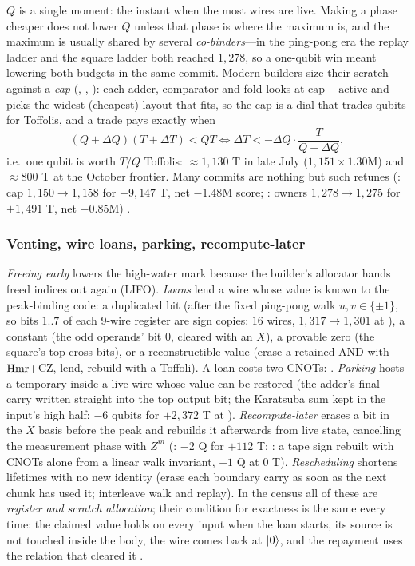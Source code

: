 $Q$ is a single moment: the instant when the most wires are live. Making a phase cheaper does not lower $Q$ unless that phase is where the maximum is, and the maximum is usually shared by several \emph{co-binders}---in the ping-pong era the replay ladder and the square ladder both reached $1{,}278$, so a one-qubit win meant lowering both budgets in the same commit. Modern builders size their scratch against a \emph{cap} (, , ): each adder, comparator and fold looks at $\mathrm{cap}-\mathrm{active}$ and picks the widest (cheapest) layout that fits, so the cap is a dial that trades qubits for Toffolis, and a trade pays exactly when
\begin{equation}\label{eq:exchange}
(Q+\Delta Q)(T+\Delta T)<QT\iff \Delta T<-\Delta Q\cdot\frac{T}{Q+\Delta Q},
\end{equation}
i.e.\ one qubit is worth $T/Q$ Toffolis: $\approx1{,}130$ T in late July ($1{,}151\times1.30$M) and $\approx800$ T at the October frontier. Many commits are nothing but such retunes (: cap $1{,}150\to1{,}158$ for $-9{,}147$ T, net $-1.48$M score; : owners $1{,}278\to1{,}275$ for $+1{,}491$ T, net $-0.85$M) \cite{ecdsafail-wiki}.

\subsubsection{Venting, wire loans, parking, recompute-later}\label{sec:venting}

\emph{Freeing early} lowers the high-water mark because the builder's allocator hands freed indices out again (LIFO). \emph{Loans} lend a wire whose value is known to the peak-binding code: a duplicated bit (after the fixed ping-pong walk $u,v\in\{\pm1\}$, so bits $1..7$ of each $9$-wire register are sign copies: $16$ wires, $1{,}317\to1{,}301$ at ), a constant (the odd operands' bit $0$, cleared with an $X$), a provable zero (the square's top cross bits), or a reconstructible value (erase a retained AND with $\mathrm{Hmr}+$CZ, lend, rebuild with a Toffoli). A loan costs two CNOTs: . \emph{Parking} hosts a temporary inside a live wire whose value can be restored (the adder's final carry written straight into the top output bit; the Karatsuba sum kept in the input's high half: $-6$ qubits for $+2{,}372$ T at ). \emph{Recompute-later} erases a bit in the $X$ basis before the peak and rebuilds it afterwards from live state, cancelling the measurement phase with $Z^m$ (: $-2$ Q for $+112$ T; : a tape sign rebuilt with CNOTs alone from a linear walk invariant, $-1$ Q at $0$ T). \emph{Rescheduling} shortens lifetimes with no new identity (erase each boundary carry as soon as the next chunk has used it; interleave walk and replay). In the census all of these are \emph{register and scratch allocation}; their condition for exactness is the same every time: the claimed value holds on every input when the loan starts, its source is not touched inside the body, the wire comes back at $\lvert 0 \rangle$, and the repayment uses the relation that cleared it \cite{ecdsafail26,ecdsafail-wiki}.

